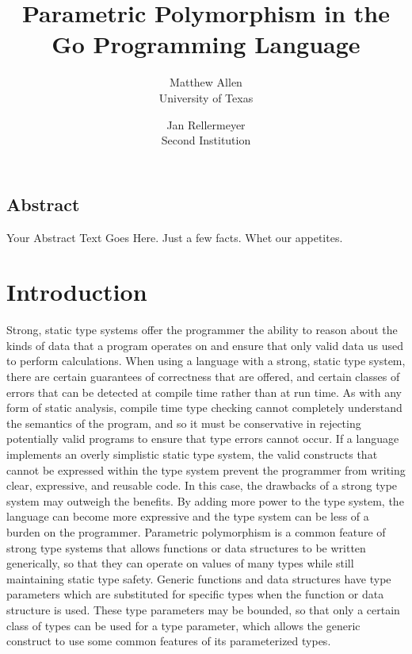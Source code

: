 \documentclass[letterpaper,twocolumn,11pt]{article}
\begin{document}
\date{}

\title{\Large \bf Parametric Polymorphism in the Go Programming Language}

\author{
  {\rm Matthew Allen}\\
  University of Texas
  \and
  {\rm Jan Rellermeyer}\\
  Second Institution
}

\maketitle

\thispagestyle{empty}


\subsection*{Abstract}
Your Abstract Text Goes Here.  Just a few facts.
Whet our appetites.

\section{Introduction} \label{introduction}

Strong, static type systems offer the programmer the ability to reason about the kinds of data that a program operates on and ensure that only valid data us used to perform calculations. When using a language with a strong, static type system, there are certain guarantees of correctness that are offered, and certain classes of errors that can be detected at compile time rather than at run time. As with any form of static analysis, compile time type checking cannot completely understand the semantics of the program, and so it must be conservative in rejecting potentially valid programs to ensure that type errors cannot occur. If a language implements an overly simplistic static type system, the valid constructs that cannot be expressed within the type system prevent the programmer from writing clear, expressive, and reusable code. In this case, the drawbacks of a strong type system may outweigh the benefits. By adding more power to the type system, the language can become more expressive and the type system can be less of a burden on the programmer. Parametric polymorphism is a common feature of strong type systems that allows functions or data structures to be written generically, so that they can operate on values of many types while still maintaining static type safety. Generic functions and data structures have type parameters which are substituted for specific types when the function or data structure is used. These type parameters may be bounded, so that only a certain class of types can be used for a type parameter, which allows the generic construct to use some common features of its parameterized types.
\end{document}
